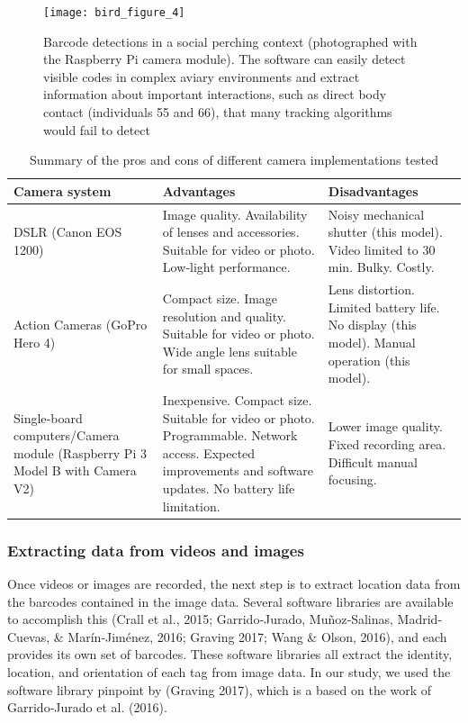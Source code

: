 \documentclass[11pt,a4paper,oneside]{article}
\begin{document}
\begin{figure}
    \centering
    \texttt{[image: bird\_figure\_4]}
    \caption{Barcode detections in a social perching context (photographed with the Raspberry Pi camera module). The software can easily detect visible codes in complex aviary environments and extract information about important interactions, such as direct body contact (individuals 55 and 66), that many tracking algorithms would fail to detect
}
    \label{fig:bird_figure_4}
\end{figure}
\begin{table}
\caption{Summary of the pros and cons of different camera implementations tested}
    \begin{tabular}{| m{} | m{} | m{} |}
    \hline
         \textbf{Camera system} & \textbf{Advantages} & \textbf{Disadvantages} \\ \hline
         DSLR (Canon EOS 1200)	& Image quality. Availability of lenses and accessories. Suitable for video or photo. Low‐light performance.	& Noisy mechanical shutter (this model). Video limited to 30 min. Bulky. Costly. \\ \hline
         Action Cameras (GoPro Hero 4)	& Compact size. Image resolution and quality. Suitable for video or photo. Wide angle lens suitable for small spaces.	& Lens distortion. Limited battery life. No display (this model). Manual operation (this model). \\ \hline
         Single‐board computers/Camera module (Raspberry Pi 3 Model B with Camera V2)	&
         Inexpensive. Compact size. Suitable for video or photo. Programmable. Network access. Expected improvements and software updates. No battery life limitation.	& Lower image quality. Fixed recording area. Difficult manual focusing. \\
         \hline
    \end{tabular}
\label{table:bird_table}
\end{table}

\subsubsection{Extracting data from videos and images}
Once videos or images are recorded, the next step is to extract location data from the barcodes contained in the image data. Several software libraries are available to accomplish this (Crall et al., 2015; Garrido‐Jurado, Muñoz‐Salinas, Madrid‐Cuevas, & Marín‐Jiménez, 2016; Graving 2017; Wang & Olson, 2016), and each provides its own set of barcodes. These software libraries all extract the identity, location, and orientation of each tag from image data. In our study, we used the software library pinpoint by (Graving 2017), which is a based on the work of Garrido‐Jurado et al. (2016).
\end{document}
